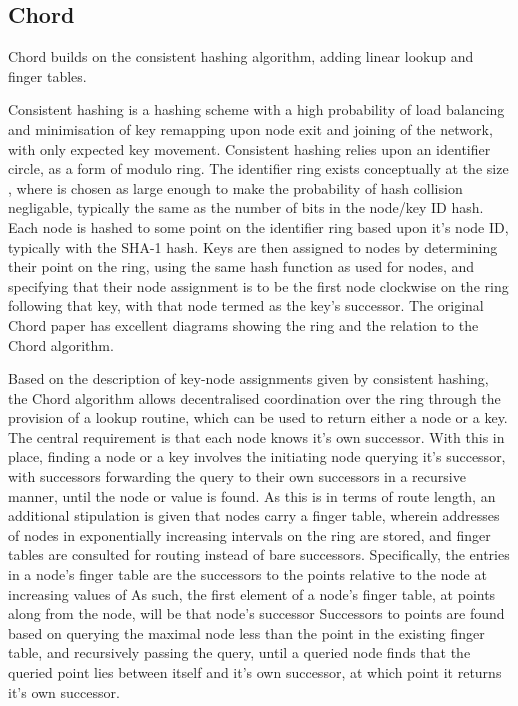 \subsection{Chord}

Chord builds on the consistent hashing algorithm, adding linear lookup and finger tables\cite{stoica2001chord}.

Consistent hashing is a hashing scheme with a high probability of load balancing and minimisation of key remapping upon node exit and joining of the network, with only  expected key movement\cite{karger1997hash}.
Consistent hashing relies upon an identifier circle, as a form of modulo ring.
The identifier ring exists conceptually at the size , where  is chosen as large enough to make the probability of hash collision negligable, typically the same as the number of bits in the node/key ID hash.
Each node is hashed to some point on the identifier ring based upon it's node ID, typically with the SHA-1 hash.
Keys are then assigned to nodes by determining their point on the ring, using the same hash function as used for nodes, and specifying that their node assignment is to be the first node clockwise on the ring following that key, with that node termed as the key's successor.
The original Chord paper has excellent diagrams showing the ring and the relation to the Chord algorithm.

Based on the description of key-node assignments given by consistent hashing, the Chord algorithm allows decentralised coordination over the ring through the provision of a lookup routine, which can be used to return either a node or a key.
The central requirement is that each node knows it's own successor.
With this in place, finding a node or a key involves the initiating node querying it's successor, with successors forwarding the query to their own successors in a recursive manner, until the node or value is found.
As this is  in terms of route length, an additional stipulation is given that nodes carry a finger table, wherein addresses of nodes in exponentially increasing intervals on the ring are stored, and finger tables are consulted for routing instead of bare successors.
Specifically, the entries in a node's finger table are the successors to the points relative to the node at increasing values of 
As such, the first element of a node's finger table, at  points along from the node, will be that node's successor
Successors to points are found based on querying the maximal node less than the point in the existing finger table, and recursively passing the query, until a queried node finds that the queried point lies between itself and it's own successor, at which point it returns it's own successor.

